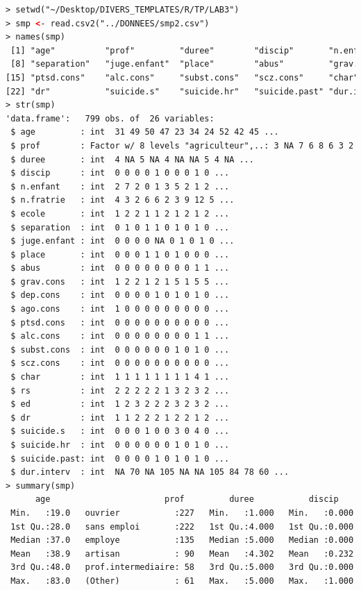 \begin{lstlisting}[language=html]
> setwd("~/Desktop/DIVERS_TEMPLATES/R/TP/LAB3")
> smp <- read.csv2("../DONNEES/smp2.csv")
> names(smp)
 [1] "age"          "prof"         "duree"        "discip"       "n.enfant"     "n.fratrie"    "ecole"       
 [8] "separation"   "juge.enfant"  "place"        "abus"         "grav.cons"    "dep.cons"     "ago.cons"    
[15] "ptsd.cons"    "alc.cons"     "subst.cons"   "scz.cons"     "char"         "rs"           "ed"          
[22] "dr"           "suicide.s"    "suicide.hr"   "suicide.past" "dur.interv"  
> str(smp)
'data.frame':	799 obs. of  26 variables:
 $ age         : int  31 49 50 47 23 34 24 52 42 45 ...
 $ prof        : Factor w/ 8 levels "agriculteur",..: 3 NA 7 6 8 6 3 2 6 6 ...
 $ duree       : int  4 NA 5 NA 4 NA NA 5 4 NA ...
 $ discip      : int  0 0 0 0 1 0 0 0 1 0 ...
 $ n.enfant    : int  2 7 2 0 1 3 5 2 1 2 ...
 $ n.fratrie   : int  4 3 2 6 6 2 3 9 12 5 ...
 $ ecole       : int  1 2 2 1 1 2 1 2 1 2 ...
 $ separation  : int  0 1 0 1 1 0 1 0 1 0 ...
 $ juge.enfant : int  0 0 0 0 NA 0 1 0 1 0 ...
 $ place       : int  0 0 0 1 1 0 1 0 0 0 ...
 $ abus        : int  0 0 0 0 0 0 0 0 1 1 ...
 $ grav.cons   : int  1 2 2 1 2 1 5 1 5 5 ...
 $ dep.cons    : int  0 0 0 0 1 0 1 0 1 0 ...
 $ ago.cons    : int  1 0 0 0 0 0 0 0 0 0 ...
 $ ptsd.cons   : int  0 0 0 0 0 0 0 0 0 0 ...
 $ alc.cons    : int  0 0 0 0 0 0 0 0 1 1 ...
 $ subst.cons  : int  0 0 0 0 0 0 1 0 1 0 ...
 $ scz.cons    : int  0 0 0 0 0 0 0 0 0 0 ...
 $ char        : int  1 1 1 1 1 1 1 1 4 1 ...
 $ rs          : int  2 2 2 2 2 1 3 2 3 2 ...
 $ ed          : int  1 2 3 2 2 2 3 2 3 2 ...
 $ dr          : int  1 1 2 2 2 1 2 2 1 2 ...
 $ suicide.s   : int  0 0 0 1 0 0 3 0 4 0 ...
 $ suicide.hr  : int  0 0 0 0 0 0 1 0 1 0 ...
 $ suicide.past: int  0 0 0 0 1 0 1 0 1 0 ...
 $ dur.interv  : int  NA 70 NA 105 NA NA 105 84 78 60 ...
> summary(smp)
      age                       prof         duree           discip         n.enfant        n.fratrie     
 Min.   :19.0   ouvrier           :227   Min.   :1.000   Min.   :0.000   Min.   : 0.000   Min.   : 0.000  
 1st Qu.:28.0   sans emploi       :222   1st Qu.:4.000   1st Qu.:0.000   1st Qu.: 0.000   1st Qu.: 2.000  
 Median :37.0   employe           :135   Median :5.000   Median :0.000   Median : 1.000   Median : 3.000  
 Mean   :38.9   artisan           : 90   Mean   :4.302   Mean   :0.232   Mean   : 1.755   Mean   : 4.287  
 3rd Qu.:48.0   prof.intermediaire: 58   3rd Qu.:5.000   3rd Qu.:0.000   3rd Qu.: 3.000   3rd Qu.: 6.000  
 Max.   :83.0   (Other)           : 61   Max.   :5.000   Max.   :1.000   Max.   :13.000   Max.   :21.000  

\end{lstlisting}
